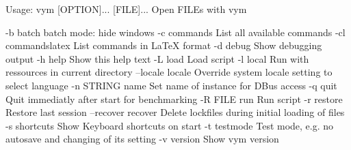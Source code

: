 Usage: vym [OPTION]... [FILE]...
Open FILEs with vym

-b           batch         batch mode: hide windows
-c           commands	    List all available commands
-cl          commandslatex List commands in LaTeX format
-d           debug         Show debugging output
-h           help          Show this help text
-L           load          Load script
-l           local         Run with ressources in current directory
--locale     locale        Override system locale setting to select
                           language
-n  STRING   name          Set name of instance for DBus access
-q           quit          Quit immediatly after start for benchmarking
-R  FILE     run           Run script
-r           restore       Restore last session
--recover    recover       Delete lockfiles during initial loading of
                           files
-s           shortcuts     Show Keyboard shortcuts on start
-t           testmode      Test mode, e.g. no autosave and changing of
                           its setting
-v           version       Show vym version

